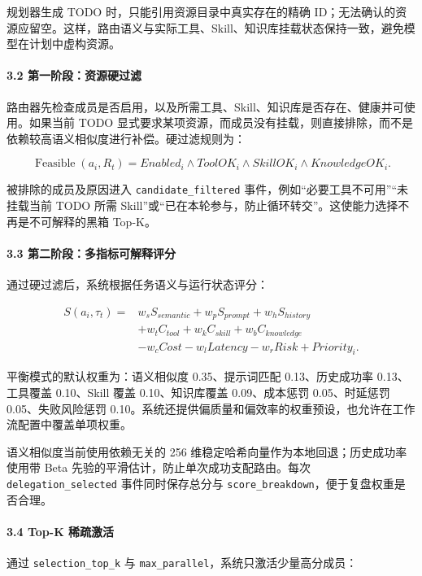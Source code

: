 \documentclass[UTF8,a4paper,12pt]{ctexart}
\begin{document}
规划器生成 TODO 时，只能引用资源目录中真实存在的精确 ID；无法确认的资源应留空。这样，路由语义与实际工具、Skill、知识库挂载状态保持一致，避免模型在计划中虚构资源。

\paragraph{3.2 第一阶段：资源硬过滤}

路由器先检查成员是否启用，以及所需工具、Skill、知识库是否存在、健康并可使用。如果当前 TODO 显式要求某项资源，而成员没有挂载，则直接排除，而不是依赖较高语义相似度进行补偿。硬过滤规则为：

\[
\operatorname{Feasible}(a_i,R_t)=
Enabled_i\land ToolOK_i\land SkillOK_i\land KnowledgeOK_i.
\]

被排除的成员及原因进入 \texttt{candidate\_filtered} 事件，例如``必要工具不可用''``未挂载当前 TODO 所需 Skill''或``已在本轮参与，防止循环转交''。这使能力选择不再是不可解释的黑箱 Top-K。

\paragraph{3.3 第二阶段：多指标可解释评分}

通过硬过滤后，系统根据任务语义与运行状态评分：

\[
\begin{aligned}
S(a_i,\tau_t)= {}&w_sS_{semantic}+w_pS_{prompt}+w_hS_{history}\\
&+w_tC_{tool}+w_kC_{skill}+w_bC_{knowledge}\\
&-w_cCost-w_lLatency-w_rRisk+Priority_i.
\end{aligned}
\]

平衡模式的默认权重为：语义相似度 0.35、提示词匹配 0.13、历史成功率 0.13、工具覆盖 0.10、Skill 覆盖 0.10、知识库覆盖 0.09、成本惩罚 0.05、时延惩罚 0.05、失败风险惩罚 0.10。系统还提供偏质量和偏效率的权重预设，也允许在工作流配置中覆盖单项权重。

语义相似度当前使用依赖无关的 256 维稳定哈希向量作为本地回退；历史成功率使用带 Beta 先验的平滑估计，防止单次成功支配路由。每次 \texttt{delegation\_selected} 事件同时保存总分与 \texttt{score\_breakdown}，便于复盘权重是否合理。

\paragraph{3.4 Top-K 稀疏激活}

通过 \texttt{selection\_top\_k} 与 \texttt{max\_parallel}，系统只激活少量高分成员：
\end{document}
